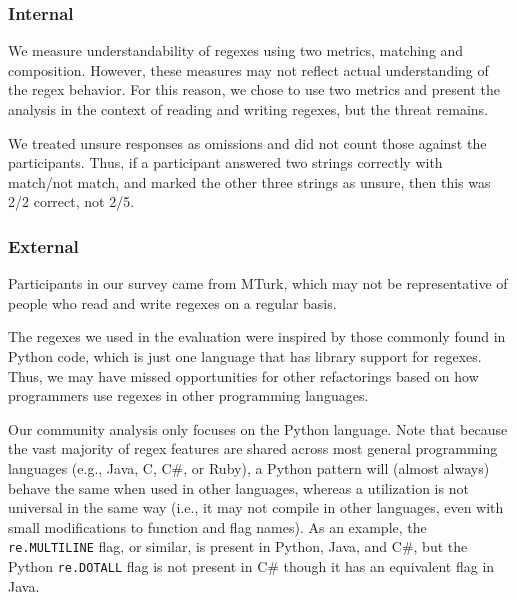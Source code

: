 \subsubsection{Internal}
We measure understandability of regexes using two metrics, matching and composition. However, these measures may not reflect actual understanding of the regex behavior. For this reason, we chose to use two metrics and present the analysis in the context of reading and writing regexes, but the threat remains.


We treated unsure responses as omissions and did not count those against the participants. Thus, if a participant answered two strings correctly with match/not match, and marked the other three strings as unsure, then this was 2/2 correct, not 2/5.

\subsubsection{External}
Participants in our survey came from MTurk, which may not be representative of people who read and write regexes on a regular basis.

The regexes we used in the evaluation were inspired by those commonly found in Python code, which is just one language that has library support for regexes. Thus, we may have missed opportunities for other refactorings based on how programmers use regexes in other programming languages.

Our community analysis only focuses on the Python language. Note that because the vast majority of regex features are shared across most general programming languages (e.g., Java, C, C\#, or Ruby), a Python {pattern} will (almost always) behave the same when used in other languages, whereas a utilization is not universal in the same way (i.e., it may not compile in other languages, even with small modifications to function and flag names).
As an example, the {\tt re.MULTILINE} flag, or similar, is present in Python, Java, and C\#, but  the Python {\tt re.DOTALL} flag is not present in C\# though it has an equivalent flag in Java.
